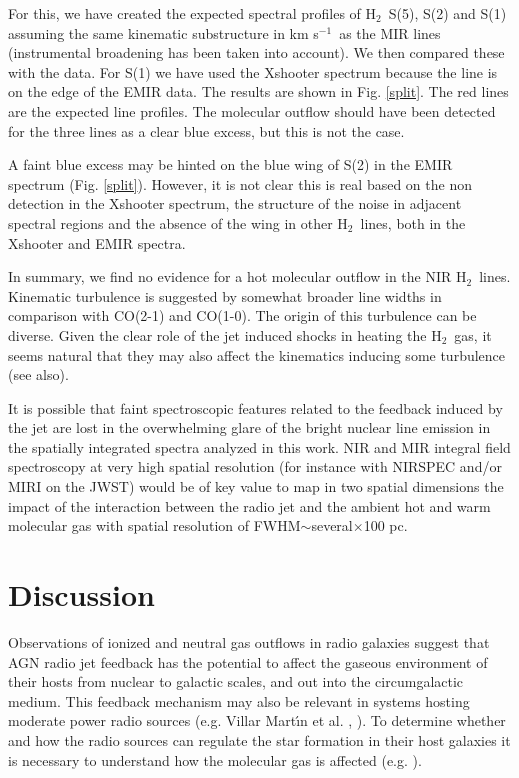 \documentclass{aa}
\newcommand{\kms}{km s$^{-1}$~}
\newcommand{\hmol}{H$_2$~}
\begin{document}
For this, we have created the expected spectral profiles of \hmol S(5), S(2) and S(1)   assuming the same kinematic substructure in \kms as the MIR lines (instrumental broadening has been taken into account). We then compared these   with the data. For S(1) we have used the Xshooter spectrum because the line is on the edge of the EMIR data.  The results are shown in Fig. \ref{split}. The red lines are the expected line profiles. The molecular outflow should have been detected for the three lines as a clear blue excess, but this is not the case.  

A faint blue excess may be hinted on the blue wing of S(2) in the EMIR spectrum (Fig. \ref{split}). However, it is not clear this is real based on the non detection in the Xshooter spectrum, the structure of the noise in adjacent spectral regions and the absence of the wing in other \hmol lines, both in the Xshooter  and EMIR spectra. 


In summary, we find no  evidence for a hot molecular outflow in the NIR \hmol lines.   Kinematic turbulence is suggested by somewhat broader line widths in comparison with   CO(2-1) and CO(1-0). The origin of this turbulence can be diverse. Given the clear role of the  jet induced shocks  in heating the \hmol gas, it seems natural that they may also affect the kinematics inducing some turbulence   (see also\citealt{Guillard2012}). 


It is possible that faint spectroscopic features related to the feedback induced by the jet are  lost in the overwhelming glare of the bright nuclear line emission in the spatially integrated spectra analyzed in this work.  NIR and MIR integral field spectroscopy at very high spatial resolution (for instance with NIRSPEC and/or MIRI on the JWST) would be of key value to map in two spatial dimensions the impact of the interaction between  the radio jet and the ambient hot and warm molecular gas with spatial resolution of FWHM$\sim$several$\times$100 pc.










\section{Discussion}
\label{discussion}



Observations of ionized and neutral gas outflows in radio galaxies    suggest that AGN
radio jet feedback has the potential to affect the   gaseous environment of their hosts from  nuclear to galactic scales,  and   out into the circumgalactic medium. This feedback mechanism may  also be relevant  in systems hosting   moderate power radio sources (e.g. Villar Mart\'\i n et al. \citeyear{Villar2017,Villar2021}, \citealt{Jarvis2019,Girdhar2022}). To determine whether and how the radio sources can regulate the star formation in their host galaxies it is necessary to understand how the molecular gas is affected (e.g. \citealt{Tadhunter2014,Morganti2021}). 
\end{document}
